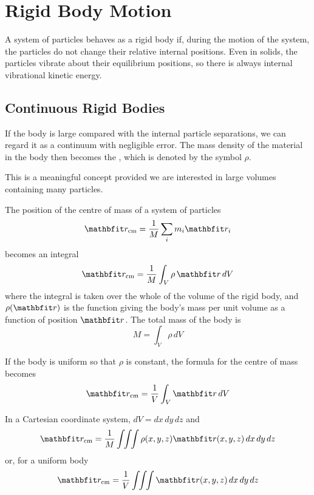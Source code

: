 %
%
%
%
%

\chapter{Rigid Body Motion}
\label{rbm chp}

A system of particles behaves as a rigid body if, during the motion of the
system, the particles do not change their relative internal positions.  Even
in solids, the particles vibrate about their equilibrium positions, so there
is always internal vibrational kinetic energy.

\section{Continuous Rigid Bodies}

If the body is large compared with the internal particle separations, we can
regard it as a continuum with negligible error.  The mass density of the
material in the body then becomes the , which is
denoted by the symbol $\rho$.

This is a meaningful concept provided we are interested in large volumes
containing many particles.

The position of the centre of mass of a system of particles
$$\vect{r}_{\rm cm}=\frac{1}{M}\sum_im_i\vect{r}_i$$
becomes an integral
$$\vect{r}_{\rm cm}=\frac{1}{M}\int_V \rho\,\vect{r}\,dV$$
where the integral is taken over the whole of the volume of the rigid body,
and $\rho(\vect{r})$ is the function giving the body's mass per unit volume
as a function of position $\vect{r}$.  The total mass of the body is
$$M=\int_V \rho\,dV$$

If the body is uniform so that $\rho$ is constant, the formula for the
centre of mass becomes
$$\vect{r}_{\rm cm}=\frac{1}{V}\int_V \vect{r}\,dV$$

In a Cartesian coordinate system, $dV=dx\,dy\,dz$ and
$$\vect{r}_{\rm cm}=\frac{1}{M}\int\!\!\int\!\!\int \rho(x,y,z)
\vect{r}(x,y,z)\,dx\,dy\,dz$$
or, for a uniform body
$$\vect{r}_{\rm cm}=\frac{1}{V}\int\!\!\int\!\!\int 
\vect{r}(x,y,z)\,dx\,dy\,dz$$

